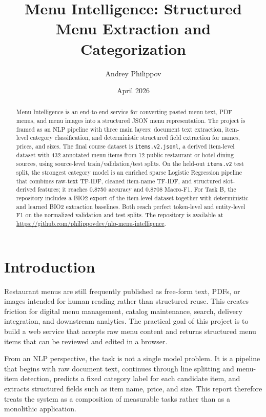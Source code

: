 \documentclass{article}
\title{Menu Intelligence: Structured Menu Extraction and Categorization}
\author{Andrey Philippov}
\date{April 2026}
\begin{document}
\maketitle

\begin{abstract}
Menu Intelligence is an end-to-end service for converting pasted menu text,
PDF menus, and menu images into a structured JSON menu representation. The
project is framed as an NLP pipeline with three main layers: document text
extraction, item-level category classification, and deterministic structured
field extraction for names, prices, and sizes. The final course dataset is
\texttt{items.v2.jsonl}, a derived item-level dataset with
432 annotated menu items from 12 public restaurant or hotel dining sources,
using source-level train/validation/test splits. On the held-out
\texttt{items.v2} test split, the strongest category model is an enriched
sparse Logistic Regression pipeline that combines raw-text TF-IDF, cleaned
item-name TF-IDF, and structured slot-derived features; it reaches 0.8750
accuracy and 0.8708 Macro-F1. For Task B, the repository includes a BIO2
export of the item-level dataset together with deterministic and learned BIO2
extraction baselines. Both reach perfect token-level and entity-level F1 on
the normalized validation and test splits. The repository is available at
\url{https://github.com/philippovdev/nlp-menu-intelligence}.
\end{abstract}

\section{Introduction}

Restaurant menus are still frequently published as free-form text, PDFs, or
images intended for human reading rather than structured reuse. This creates
friction for digital menu management, catalog maintenance, search, delivery
integration, and downstream analytics. The practical goal of this project is
to build a web service that accepts raw menu content and returns structured
menu items that can be reviewed and edited in a browser.

From an NLP perspective, the task is not a single model problem. It is a
pipeline that begins with raw document text, continues through line splitting
and menu-item detection, predicts a fixed category label for each candidate
item, and extracts structured fields such as item name, price, and size. This
report therefore treats the system as a composition of measurable tasks rather
than as a monolithic application.
\end{document}
